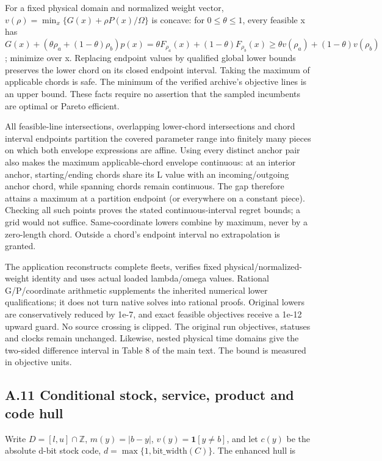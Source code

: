 \documentclass[
  american,
  11pt,
]{article}
\begin{document}
For a fixed physical domain and normalized weight vector,
\(v(\rho)=\min_x\{G(x)+\rho P(x)/\Omega\}\) is concave: for
\(0\le\theta\le1\), every feasible x has
\(G(x)+(\theta\rho_a+(1-\theta)\rho_b)p(x)=\theta F_{\rho_a}(x)+(1-\theta)F_{\rho_b}(x)\ge\theta v(\rho_a)+(1-\theta)v(\rho_b)\);
minimize over x. Replacing endpoint values by qualified global lower
bounds preserves the lower chord on its closed endpoint interval. Taking
the maximum of applicable chords is safe. The minimum of the verified
archive's objective lines is an upper bound. These facts require no
assertion that the sampled incumbents are optimal or Pareto efficient.

All feasible-line intersections, overlapping lower-chord intersections
and chord interval endpoints partition the covered parameter range into
finitely many pieces on which both envelope expressions are affine.
Using every distinct anchor pair also makes the maximum applicable-chord
envelope continuous: at an interior anchor, starting/ending chords share
its L value with an incoming/outgoing anchor chord, while spanning
chords remain continuous. The gap therefore attains a maximum at a
partition endpoint (or everywhere on a constant piece). Checking all
such points proves the stated continuous-interval regret bounds; a grid
would not suffice. Same-coordinate lowers combine by maximum, never by a
zero-length chord. Outside a chord's endpoint interval no extrapolation
is granted.

The application reconstructs complete fleets, verifies fixed
physical/normalized-weight identity and uses actual loaded lambda/omega
values. Rational G/P/coordinate arithmetic supplements the inherited
numerical lower qualifications; it does not turn native solves into
rational proofs. Original lowers are conservatively reduced by 1e-7, and
exact feasible objectives receive a 1e-12 upward guard. No source
crossing is clipped. The original run objectives, statuses and clocks
remain unchanged. Likewise, nested physical time domains give the
two-sided difference interval in Table 8 of the main text. The bound is
measured in objective units.

\subsection{A.11 Conditional stock, service, product and code
hull}\label{a.11-conditional-stock-service-product-and-code-hull}

Write \(D=[l,u]\cap\mathbb Z\), \(m(y)=|b-y|\),
\(v(y)=\mathbf1[y\ne b]\), and let \(c(y)\) be the absolute d-bit stock
code, \(d=\max\{1,\operatorname{bit\_\allowbreak{}width}(C)\}\). The enhanced hull is
\end{document}
